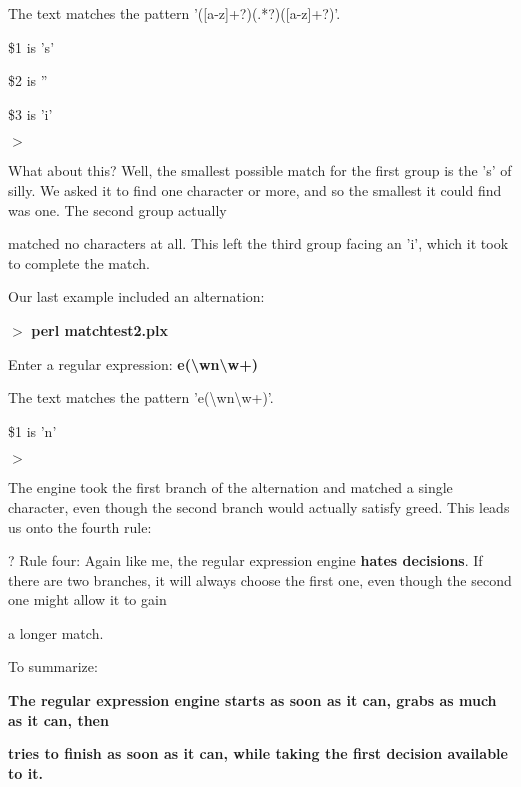 \documentclass[a4paper,11pt]{book}
\begin{document}
\noindent The text matches the pattern '([a-z]+?)(.*?)([a-z]+?)'.

\noindent \$1 is 's'

\noindent \$2 is ''

\noindent \$3 is 'i'

\noindent $>$

\noindent 

\noindent What about this? Well, the smallest possible match for the first group is the 's' of silly. We asked it to find one character or more, and so the smallest it could find was one. The second group actually

\noindent matched no characters at all. This left the third group facing an 'i', which it took to complete the match.

\noindent 

\noindent Our last example included an alternation:

\noindent 

\noindent $>$ \textbf{perl matchtest2.plx}

\noindent Enter a regular expression: \textbf{e(\textbackslash w\textbar n\textbackslash w+)}

\noindent The text matches the pattern 'e(\textbackslash w\textbar n\textbackslash w+)'.

\noindent \$1 is 'n'

\noindent $>$

\noindent 

\noindent The engine took the first branch of the alternation and matched a single character, even though the second branch would actually satisfy greed. This leads us onto the fourth rule:

\noindent 

\noindent ? Rule  four: Again like me, the regular expression engine \textbf{hates decisions}. If there are two branches, it will always choose the first one, even though the second one might allow it to gain

\noindent a longer match.

\noindent 

\noindent 

\noindent To summarize:

\noindent 

\noindent 

\noindent \textbf{The regular expression engine starts as soon as it can, grabs as much as it can, then}

\noindent \textbf{tries to finish as soon as it can, while taking the first decision available to it.}
\end{document}
